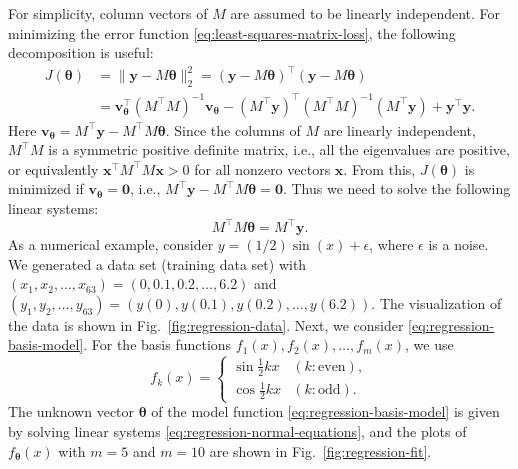 {For simplicity, column vectors of $M$ are assumed to be linearly independent. For minimizing the error function \eqref{eq:least-squares-matrix-loss}, the following decomposition is useful:}
\begin{equation}\label{eq:least-squares-square-completion}
\begin{aligned}
J(\boldsymbol{\theta})&=\|\boldsymbol{y}-M\boldsymbol{\theta}\|_2^2=(\boldsymbol{y}-M\boldsymbol{\theta})^{\top}(\boldsymbol{y}-M\boldsymbol{\theta})\\
&=\boldsymbol{v}_{\boldsymbol{\theta}}^{\top}(M^{\top}M)^{-1}\boldsymbol{v}_{\boldsymbol{\theta}}-(M^{\top}\boldsymbol{y})^{\top}(M^{\top}M)^{-1}(M^{\top}\boldsymbol{y})+\boldsymbol{y}^{\top}\boldsymbol{y}.
\end{aligned}
\end{equation}
{Here $\boldsymbol{v}_{\boldsymbol{\theta}}=M^{\top}\boldsymbol{y}-M^{\top}M\boldsymbol{\theta}$. Since the columns of $M$ are linearly independent, $M^{\top}M$ is a symmetric positive definite matrix, i.e., all the eigenvalues are positive, or equivalently $\boldsymbol{x}^{\top}M^{\top}M\boldsymbol{x}>0$ for all nonzero vectors $\boldsymbol{x}$. From this, $J(\boldsymbol{\theta})$ is minimized if $\boldsymbol{v}_{\boldsymbol{\theta}}=\boldsymbol{0}$, i.e., $M^{\top}\boldsymbol{y}-M^{\top}M\boldsymbol{\theta}=\boldsymbol{0}$. Thus we need to solve the following linear systems:}
\begin{equation}\label{eq:regression-normal-equations}
M^{\top}M\boldsymbol{\theta}=M^{\top}\boldsymbol{y}.
\end{equation}
{As a numerical example, consider $y=(1/2)\sin(x)+\epsilon$, where $\epsilon$ is a noise. We generated a data set (training data set) with $(x_1,x_2,\ldots,x_{63})=(0,0.1,0.2,\ldots,6.2)$ and $(y_1,y_2,\ldots,y_{63})=(y(0),y(0.1),y(0.2),\ldots,y(6.2))$. The visualization of the data is shown in Fig.\ \ref{fig:regression-data}.}
{Next, we consider \eqref{eq:regression-basis-model}. For the basis functions $f_1(x),f_2(x),\ldots,f_m(x)$, we use}
\[f_k(x)=\begin{cases}\sin\frac12kx&(k:\text{even}),\\\cos\frac12kx&(k:\text{odd}).\end{cases}\]
{The unknown vector $\boldsymbol{\theta}$ of the model function \eqref{eq:regression-basis-model} is given by solving linear systems \eqref{eq:regression-normal-equations}, and the plots of $f_{\boldsymbol{\theta}}(x)$ with $m=5$ and $m=10$ are shown in Fig.\ \ref{fig:regression-fit}.}
